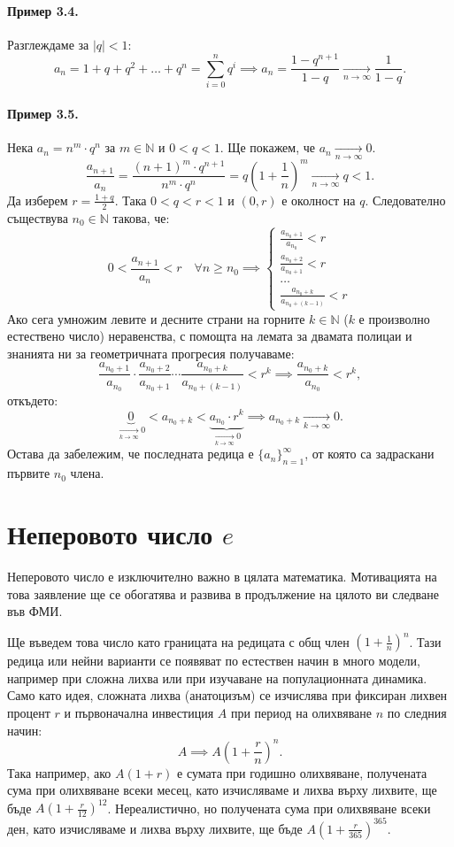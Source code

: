 \paragraph{Пример 3.4.}
Разглеждаме за $|q| < 1$:
\[
a_n = 1 + q + q^2 + \dots + q^n = \sum_{i=0}^n q^i \implies a_n = \frac{1 - q^{n+1}}{1 - q} \xrightarrow[n\to\infty]{} \frac{1}{1 - q}.
\]

\paragraph{Пример 3.5.}
Нека $a_n = n^m \cdot q^n$ за $m \in \mathbb{N}$ и $0 < q < 1$. Ще покажем, че $a_n \xrightarrow[n\to\infty]{} 0$.
\[
\frac{a_{n+1}}{a_n} = \frac{(n + 1)^m \cdot q^{n+1}}{n^m \cdot q^n} = q\left(1 + \frac{1}{n}\right)^m \xrightarrow[n\to\infty]{} q < 1.
\]
Да изберем $r = \frac{1 + q}{2}$. Така $0 < q < r < 1$ и $(0, r)$ е околност на $q$. Следователно съществува $n_0 \in \mathbb{N}$ такова, че:
\[
0 < \frac{a_{n+1}}{a_n} < r \quad \forall n \ge n_0 \implies
\begin{cases}
\frac{a_{n_0+1}}{a_{n_0}} < r \\
\frac{a_{n_0+2}}{a_{n_0+1}} < r \\
\dots \\
\frac{a_{n_0+k}}{a_{n_0+(k-1)}} < r
\end{cases}
\]
Ако сега умножим левите и десните страни на горните $k \in \mathbb{N}$ ($k$ е произволно естествено число) неравенства, с помощта на лемата за двамата полицаи и знанията ни за геометричната прогресия получаваме:
\[
\frac{a_{n_0+1}}{a_{n_0}} \cdot \frac{a_{n_0+2}}{a_{n_0+1}} \cdots \frac{a_{n_0+k}}{a_{n_0+(k-1)}} < r^k \implies \frac{a_{n_0+k}}{a_{n_0}} < r^k,
\]
откъдето:
\[
\underbrace{0}_{\xrightarrow[k\to\infty]{} 0} < a_{n_0+k} < \underbrace{a_{n_0} \cdot r^k}_{\xrightarrow[k\to\infty]{} 0} \implies a_{n_0+k} \xrightarrow[k\to\infty]{} 0.
\]
Остава да забележим, че последната редица е $\{a_n\}_{n=1}^{\infty}$, от която са задраскани първите $n_0$ члена.

\section{Неперовото число $e$}

Неперовото число е изключително важно в цялата математика. Мотивацията на това заявление ще се обогатява и развива в продължение на цялото ви следване във ФМИ.

Ще въведем това число като границата на редицата с общ член $\left(1 + \frac{1}{n}\right)^n$. Тази редица или нейни варианти се появяват по естествен начин в много модели, например при сложна лихва или при изучаване на популационната динамика. Само като идея, сложната лихва (анатоцизъм) се изчислява при фиксиран лихвен процент $r$ и първоначална инвестиция $A$ при период на олихвяване $n$ по следния начин:
\[
A \implies A\left(1 + \frac{r}{n}\right)^n.
\]
Така например, ако $A(1 + r)$ е сумата при годишно олихвяване, получената сума при олихвяване всеки месец, като изчисляваме и лихва върху лихвите, ще бъде $A\left(1 + \frac{r}{12}\right)^{12}$. Нереалистично, но получената сума при олихвяване всеки ден, като изчисляваме и лихва върху лихвите, ще бъде $A\left(1 + \frac{r}{365}\right)^{365}$.

